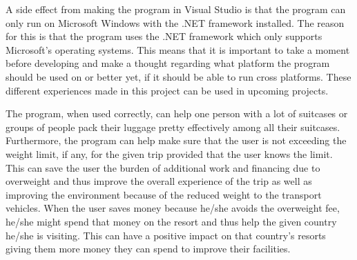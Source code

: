 A side effect from making the program in Visual Studio is that the program can only run on Microsoft Windows with the .NET framework installed. The reason for this is that the program uses the .NET framework which only supports Microsoft's operating systems.
This means that it is important to take a moment before developing and make a thought regarding what platform the program should be used on or better yet, if it should be able to run cross platforms.
These different experiences made in this project can be used in upcoming projects.

The program, when used correctly, can help one person with a lot of suitcases or groups of people pack their luggage pretty effectively among all their suitcases. Furthermore, the program can help make sure that the user is not exceeding the weight limit, if any, for the given trip provided that the user knows the limit. This can save the user the burden of additional work and financing due to overweight and thus improve the overall experience of the trip as well as improving the environment because of the reduced weight to the transport vehicles. When the user saves money because he/she avoids the overweight fee, he/she might spend that money on the resort and thus help the given country he/she is visiting. This can have a positive impact on that country's resorts giving them more money they can spend to improve their facilities.